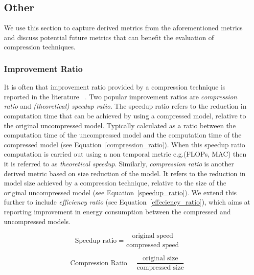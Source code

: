 \subsection{Other}
We use this section to capture derived metrics from the aforementioned metrics and discuss potential future metrics that can benefit the evaluation of compression techniques. 

\subsubsection{Improvement Ratio}
It is often that improvement ratio provided by a compression technique is reported in the literature ~\cite{He2018,Blalock2018,Menghani2023}. Two popular improvement ratios are \textit{compression ratio} and \textit{(theoretical) speedup ratio}.
%
The speedup ratio refers to the reduction in computation time that can be achieved by using a compressed model, relative to the original uncompressed model. Typically calculated as a ratio between the computation time of the uncompressed model and the computation time of the compressed model (see Equation~\ref{compression_ratio}). When this speedup ratio computation is carried out using a non temporal metric e.g.(FLOPs, MAC) then it is referred to as \textit{theoretical speedup}.
%
Similarly, \textit{compression ratio} is another derived metric based on size reduction of the model. It refers to the reduction in model size achieved by a compression technique, relative to the size of the original uncompressed model (see Equation~\ref{speedup_ratio}). 
%
We extend this further to include \textit{efficiency ratio} (see Equation~\ref{effeciency_ratio}), which aims at reporting improvement in energy consumption between the compressed and uncompressed models.
 
\begin{equation}
  \text{Speedup ratio} =   \frac{\text{original speed}}{\text{compressed speed}}
  \label{speedup_ratio}
\end{equation}

\begin{equation}
  \text{Compression Ratio} =   \frac{\text{original size}}{\text{compressed size}}
  \label{compression_ratio}
\end{equation}


